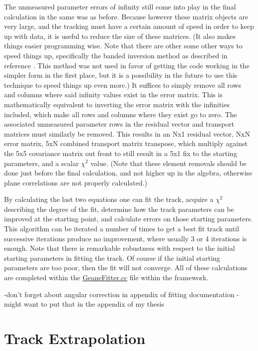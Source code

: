     The unmeasured parameter errors of infinity still come into play in the final calculation in the same was as before. Because however these matrix objects are very large, and the tracking must have a certain amount of speed in order to keep up with data, it is useful to reduce the size of these matrices. (It also makes things easier programming wise. Note that there are other some other ways to speed things up, specifically the banded inversion method as described in reference \cite{trajfit}. This method was not used in favor of getting the code working in the simpler form in the first place, but it is a possibility in the future to use this technique to speed things up even more.) It suffices to simply remove all rows and columns where said infinity values exist in the error matrix. This is mathematically equivalent to inverting the error matrix with the infinities included, which make all rows and columns where they exist go to zero. The associated unmeasured parameter rows in the residual vector and transport matrices must similarly be removed. This results in an Nx1 residual vector, NxN error matrix, 5xN combined transport matrix transpose, which multiply against the 5x5 covariance matrix out front to still result in a 5x1 fix to the starting parameters, and a scalar $\chi^2$ value. (Note that these element removals should be done just before the final calculation, and not higher up in the algebra, otherwise plane correlations are not properly calculated.)

    By calculating the last two equations one can fit the track, acquire a $\chi^{2}$ describing the degree of the fit, determine how the track parameters can be improved at the starting point, and calculate errors on those starting parameters. This algorithm can be iterated a number of times to get a best fit track until successive iterations produce no improvement, where usually 3 or 4 iterations is enough. Note that there is remarkable robustness with respect to the initial starting parameters in fitting the track. Of course if the initial starting parameters are too poor, then the fit will not converge. All of these calculations are completed within the \hyperref[sec:GeaneFitter]{GeaneFitter.cc} file within the framework.




-don't forget about angular correction in appendix of fitting documentation - might want to put that in the appendix of my thesis




\section{Track Extrapolation}
\label{sec:TrackExtrapolation}


